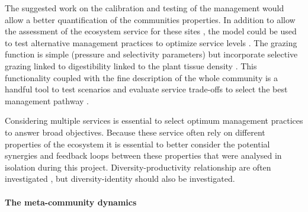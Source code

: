 The suggested work on the calibration and testing of the management would allow a better quantification of the communities properties. In addition to allow the assessment of the ecosystem service for these sites \parencite{bello_towards_2010, lavorel_using_2011}, the model could be used to test alternative management practices to optimize service levels \parencite{goslee_optimizing_2013}. The grazing function is simple (pressure and selectivity parameters) but incorporate selective grazing linked to digestibility linked to the plant tissue density \parencite{gardarin_plant_2014}. This functionality coupled with the fine description of the whole community is a handful tool to test scenarios and evaluate service trade-offs to select the best management pathway \parencite{lafond_reconciling_2015}.

Considering multiple services is essential to select optimum management practices to answer broad objectives. Because these service often rely on different properties of the ecosystem \parencite{lavorel_how_2012, lamarque_plant_2014} it is essential to better consider the potential synergies and feedback loops between these properties that were analysed in isolation during this project. Diversity-productivity relationship are often investigated \cite{tilman_diversity_2001, lepik_high_2005}, but diversity-identity \parencite{zuppinger-dingley_selection_2014} should also be investigated.
%

\paragraph{The meta-community dynamics}

